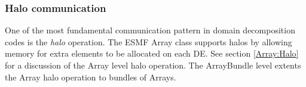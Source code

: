  
\setlength{\oldparskip}{\parskip}
\setlength{\parskip}{1.5ex}
\setlength{\oldparindent}{\parindent}
\setlength{\parindent}{0pt}
\setlength{\oldbaselineskip}{\baselineskip}
\setlength{\baselineskip}{11pt}
 
\def\bv{\begin{verbatim}}
\def\ev{\end{verbatim}}
\def\be{\begin{equation}}
\def\ee{\end{equation}}
\def\bea{\begin{eqnarray}}
\def\eea{\end{eqnarray}}
\def\bi{\begin{itemize}}
\def\ei{\end{itemize}}
\def\bn{\begin{enumerate}}
\def\en{\end{enumerate}}
\def\bd{\begin{description}}
\def\ed{\end{description}}
\def\({\left (}
\def\){\right )}
\def\[{\left [}
\def\]{\right ]}
\def\<{\left  \langle}
\def\>{\right \rangle}
\def\cI{{\cal I}}
\def\diag{\mathop{\rm diag}}
\def\tr{\mathop{\rm tr}}


 

   \subsubsection{Halo communication}
  
   One of the most fundamental communication pattern in domain decomposition
   codes is the {\em halo} operation. The ESMF Array class supports halos
   by allowing memory for extra elements to be allocated on each DE. See
   section \ref{Array:Halo} for a discussion of the Array level halo operation.
   The ArrayBundle level extents the Array halo operation to bundles of Arrays.
  
